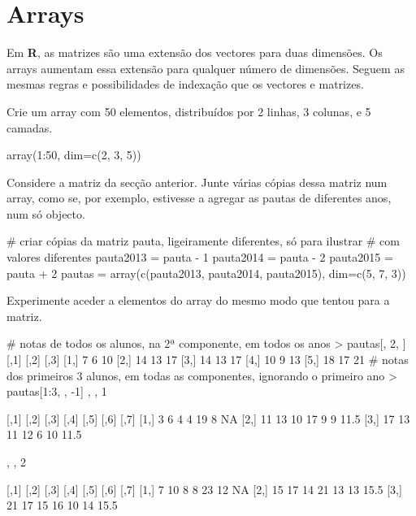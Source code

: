 \documentclass{exam}
\begin{document}
\section{Arrays}
Em \textbf{R}, as matrizes são uma extensão dos vectores para duas dimensões. Os arrays aumentam essa extensão para qualquer número de dimensões. Seguem as mesmas regras e possibilidades de indexação que os vectores e matrizes.

\begin{questions}
\question Crie um array com 50 elementos, distribuídos por 2 linhas, 3 colunas, e 5 camadas.

\begin{solution}
	\begin{rcode}
		array(1:50, dim=c(2, 3, 5))
	\end{rcode}
\end{solution}


\question Considere a matriz  da secção anterior. Junte várias cópias dessa matriz num array, como se, por exemplo, estivesse a agregar as pautas de diferentes anos, num só objecto.

\begin{solution}
	\begin{rcode}
		# criar cópias da matriz pauta, ligeiramente diferentes, só para ilustrar
		# com valores diferentes
		pauta2013 = pauta - 1
		pauta2014 = pauta - 2
		pauta2015 = pauta + 2
		pautas = array(c(pauta2013, pauta2014, pauta2015), dim=c(5, 7, 3))
	\end{rcode}
\end{solution}

\question Experimente aceder a elementos do array do mesmo modo que tentou para a matriz.

\begin{solution}
	\begin{rcode}
		# notas de todos os alunos, na 2ª componente, em todos os anos
		> pautas[, 2, ]
		     [,1] [,2] [,3]
		[1,]    7    6   10
		[2,]   14   13   17
		[3,]   14   13   17
		[4,]   10    9   13
		[5,]   18   17   21
		# notas dos primeiros 3 alunos, em todas as componentes, ignorando o primeiro ano
		> pautas[1:3, , -1]
		, , 1
		
		     [,1] [,2] [,3] [,4] [,5] [,6] [,7]
		[1,]    3    6    4    4   19    8   NA
		[2,]   11   13   10   17    9    9 11.5
		[3,]   17   13   11   12    6   10 11.5
		
		, , 2
		
		     [,1] [,2] [,3] [,4] [,5] [,6] [,7]
		[1,]    7   10    8    8   23   12   NA
		[2,]   15   17   14   21   13   13 15.5
		[3,]   21   17   15   16   10   14 15.5
	\end{rcode}
\end{solution}

\end{questions}
\end{document}
